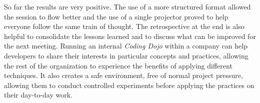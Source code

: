 So far the results are very positive. The use of a more structured format allowed the session to
flow better and the use of a single projector proved to help everyone follow the same train of
thought. The retrospective at the end is also helpful to consolidate the lessons learned and to
discuss what can be improved for the next meeting. Running an internal \emph{Coding Dojo} within
a company can help developers to share their interests in particular concepts and practices, allowing
the rest of the organization to experience the benefits of applying different techniques. It also
creates a safe environment, free of normal project pressure, allowing them to conduct controlled
experiments before applying the practices on their day-to-day work.
